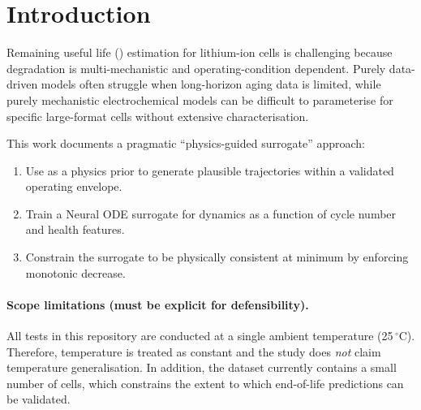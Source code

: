 \section{Introduction}
\label{sec:introduction}

Remaining useful life (\RUL) estimation for lithium-ion cells is challenging
because degradation is multi-mechanistic and operating-condition dependent.
Purely data-driven models often struggle when long-horizon aging data is
limited, while purely mechanistic electrochemical models can be difficult to
parameterise for specific large-format cells without extensive
characterisation.

This work documents a pragmatic ``physics-guided surrogate'' approach:
\begin{enumerate}
  \item Use \pybamm \citep{Sulzer2021PyBaMM} as a physics prior to generate
  plausible trajectories within a validated operating envelope.
  \item Train a Neural ODE surrogate \citep{Chen2018NeuralODE} for \SOH dynamics
  as a function of cycle number and health features.
  \item Constrain the surrogate to be physically consistent at minimum by
  enforcing monotonic \SOH decrease.
\end{enumerate}

\paragraph{Scope limitations (must be explicit for defensibility).}
All tests in this repository are conducted at a single ambient temperature
(25\,$^\circ$C). Therefore, temperature is treated as constant and the study
does \emph{not} claim temperature generalisation. In addition, the dataset
currently contains a small number of cells, which constrains the extent to
which end-of-life predictions can be validated.

